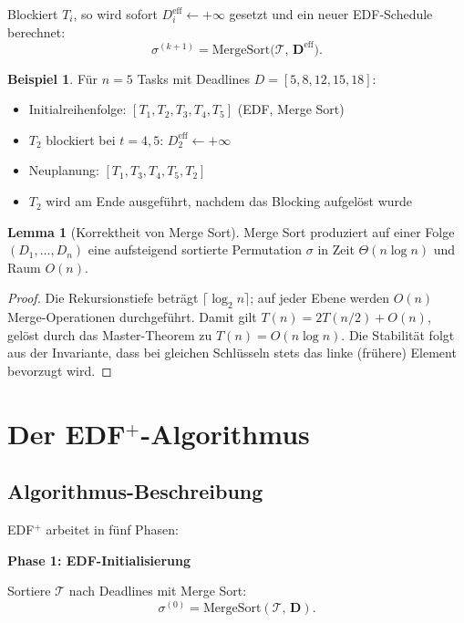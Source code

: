 ﻿\documentclass[a4paper,12pt]{article}
\theoremstyle{definition}
\newtheorem{beispiel}{Beispiel}
\newtheorem{lemma}{Lemma}
\begin{document}
	Blockiert $T_i$, so wird sofort $D_i^{\text{eff}} \leftarrow +\infty$ gesetzt
	und ein neuer EDF-Schedule berechnet:
	\[
	\sigma^{(k+1)} = \mathrm{MergeSort}\!\bigl(\mathcal{T},\, \mathbf{D}^{\text{eff}}\bigr).
	\]
	
	\begin{beispiel}
		Für $n=5$ Tasks mit Deadlines $D = [5, 8, 12, 15, 18]$:
		\begin{itemize}
			\item Initialreihenfolge: $[T_1, T_2, T_3, T_4, T_5]$ (EDF, Merge Sort)
			\item $T_2$ blockiert bei $t=4{,}5$: $D_2^{\text{eff}} \leftarrow +\infty$
			\item Neuplanung: $[T_1, T_3, T_4, T_5, T_2]$
			\item $T_2$ wird am Ende ausgeführt, nachdem das Blocking aufgelöst wurde
		\end{itemize}
	\end{beispiel}
	
	\begin{lemma}[Korrektheit von Merge Sort]
		Merge Sort produziert auf einer Folge $(D_1,\ldots,D_n)$ eine aufsteigend
		sortierte Permutation $\sigma$ in Zeit $\Theta(n\log n)$ und Raum $O(n)$.
	\end{lemma}
	
	\begin{proof}
		Die Rekursionstiefe beträgt $\lceil\log_2 n\rceil$; auf jeder Ebene werden
		$O(n)$ Merge-Opera\-tionen durchgeführt. Damit gilt $T(n) = 2T(n/2) + O(n)$,
		gelöst durch das Master-Theorem zu $T(n) = O(n\log n)$. Die Stabilität
		folgt aus der Invariante, dass bei gleichen Schlüsseln stets das linke
		(frühere) Element bevorzugt wird.
	\end{proof}
	
	\section{Der EDF$^+$-Algorithmus}
	
	\subsection{Algorithmus-Beschreibung}
	
	EDF$^+$ arbeitet in fünf Phasen:
	
	\textbf{Phase 1: EDF-Initialisierung}
	
	Sortiere $\mathcal{T}$ nach Deadlines mit Merge Sort:
	\[
	\sigma^{(0)} = \mathrm{MergeSort}(\mathcal{T},\, \mathbf{D}).
	\]
	
\end{document}
